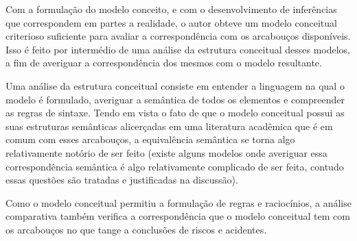 Com a formulação do modelo conceito, e com o desenvolvimento de inferências que correspondem em partes a realidade, o autor obteve um modelo conceitual criterioso suficiente para avaliar a correspondência com os arcabouços disponíveis. Isso é feito por intermédio de uma análise da estrutura conceitual desses modelos, a fim de averiguar a correspondência dos mesmos com o modelo resultante.

Uma análise da estrutura conceitual consiste em entender a linguagem na qual o modelo é formulado, averiguar a semântica de todos os elementos e compreender as regras de sintaxe. Tendo em vista o fato de que o modelo conceitual possui as suas estruturas semânticas alicerçadas em uma literatura acadêmica que é em comum com esses arcabouços, a equivalência semântica se torna algo relativamente notório de ser feito (existe alguns modelos onde averiguar essa correspondência semântica é algo relativamente complicado de ser feita, contudo essas questões são tratadas e justificadas na discussão).

Como o modelo conceitual permitiu a formulação de regras e raciocínios, a análise comparativa também verifica a correspondência que o modelo conceitual tem com os arcabouços no que tange a conclusões de riscos e acidentes.